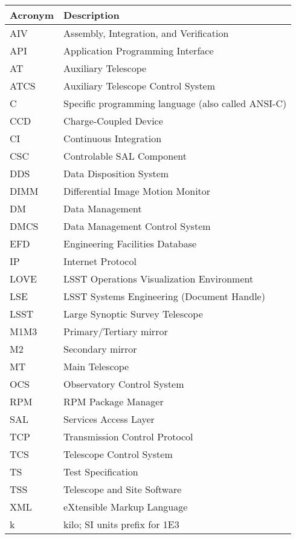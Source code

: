 \addtocounter{table}{-1}
\begin{longtable}{|l|p{}|}\hline
\textbf{Acronym} & \textbf{Description}  \\\hline

AIV & Assembly, Integration, and Verification \\\hline
API & Application Programming Interface \\\hline
AT & Auxiliary Telescope \\\hline
ATCS & Auxiliary Telescope Control System \\\hline
C & Specific programming language (also called ANSI-C) \\\hline
CCD & Charge-Coupled Device \\\hline
CI & Continuous Integration \\\hline
CSC & Controlable SAL Component \\\hline
DDS & Data Disposition System \\\hline
DIMM & Differential Image Motion Monitor \\\hline
DM & Data Management \\\hline
DMCS & Data Management Control System \\\hline
EFD & Engineering Facilities Database \\\hline
IP & Internet Protocol \\\hline
LOVE & LSST Operations Visualization Environment \\\hline
LSE & LSST Systems Engineering (Document Handle) \\\hline
LSST & Large Synoptic Survey Telescope \\\hline
M1M3 & Primary/Tertiary mirror \\\hline
M2 & Secondary mirror \\\hline
MT & Main Telescope \\\hline
OCS & Observatory Control System \\\hline
RPM & RPM Package Manager \\\hline
SAL & Services Access Layer \\\hline
TCP & Transmission Control Protocol \\\hline
TCS & Telescope Control System \\\hline
TS & Test Specification \\\hline
TSS & Telescope and Site Software \\\hline
XML & eXtensible Markup Language \\\hline
k & kilo; SI units prefix for 1E3 \\\hline
\end{longtable}
